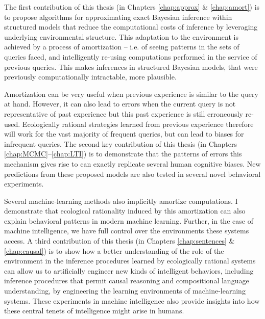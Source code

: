 The first contribution of this thesis (in Chapters \ref{chap:approx} \& \ref{chap:amort}) is to propose algorithms for approximating exact Bayesian inference within structured models that reduce the computational costs of inference by leveraging underlying environmental structure. This adaptation to the environment is achieved by a process of amortization -- i.e. of seeing patterns in the sets of queries faced, and intelligently re-using computations performed in the service of previous queries. This makes inferences in structured Bayesian models, that were previously computationally intractable, more plausible.

Amortization can be very useful when previous experience is similar to the query at hand. However, it can also lead to errors when the current query is not representative of past experience but this past experience is still erroneously re-used. Ecologically rational strategies learned from previous experience therefore will work for the vast majority of frequent queries, but can lead to biases for infrequent queries. The second key contribution of this thesis (in Chapters \ref{chap:MCMC}--\ref{chap:LTI}) is to demonstrate that the patterns of errors this mechanism gives rise to can exactly replicate several human cognitive biases. New predictions from these proposed models are also tested in several novel behavioral experiments.

Several machine-learning methods also implicitly amortize computations. I demonstrate that ecological rationality induced by this amortization can also explain behavioral patterns in modern machine learning. Further, in the case of machine intelligence, we have full control over the environments these systems access. A third contribution of this thesis (in Chapters \ref{chap:sentences} \& \ref{chap:causal}) is to show how a better understanding of the role of the environment in the inference procedures learned by ecologically rational systems can allow us to artificially engineer new kinds of intelligent behaviors, including inference procedures that permit causal reasoning and compositional language understanding, by engineering the learning environments of machine-learning systems. These experiments in machine intelligence also provide insights into how these central tenets of intelligence might arise in humans.


